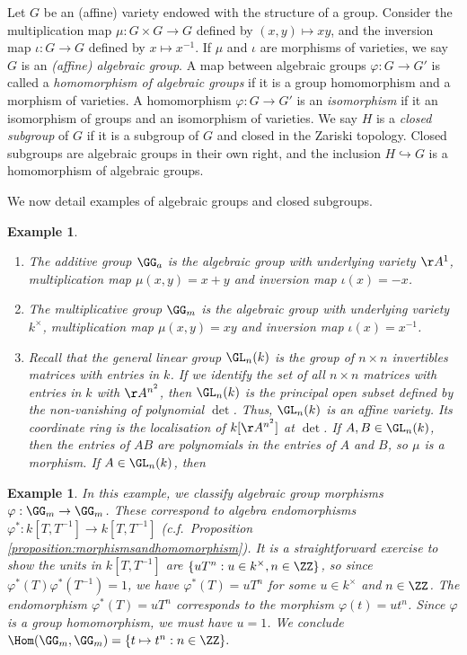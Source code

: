 \documentclass[12pt]{amsart}
\theoremstyle{plain}
\newtheorem{example}[theorem]{Example}
\begin{document}
Let $G$ be an (affine) variety endowed with the structure of a group.
Consider the multiplication map $\mu : G \times G \to G$ defined by $(x, y) \mapsto xy$, and the inversion map $\iota : G \to G$ defined by $x \mapsto x^{-1}$.
If $\mu$ and $\iota$ are morphisms of varieties, we say $G$ is an \emph{(affine) algebraic group}.
A map between algebraic groups $\varphi : G \to G'$ is called a \emph{homomorphism of algebraic groups} if it is a group homomorphism and a morphism of varieties.
A homomorphism $\varphi:G\to G'$ is an \emph{isomorphism} if it an isomorphism of groups and an isomorphism of varieties.
We say $H$ is a \emph{closed subgroup} of $G$ if it is a subgroup of $G$ and closed in the Zariski topology.
Closed subgroups are algebraic groups in their own right, and the inclusion $H \hookrightarrow G$ is a homomorphism of algebraic groups.

We now detail examples of algebraic groups and closed subgroups.

\begin{example}
\begin{enumerate}
\item The additive group $\GG_a$ is the algebraic group with underlying variety $\AA^1$, multiplication map $\mu(x, y) = x + y$ and inversion map $\iota(x) = - x$. 
\item The multiplicative group $\GG_m$ is the algebraic group with underlying variety $k^\times$, multiplication map $\mu(x, y) = xy$ and inversion map $\iota(x) = x^{-1}$.
\item Recall that the general linear group $\GL_n(k)$ is the group of $n \times n$ invertibles matrices with entries in $k$.
If we identify the set of all $n \times n$ matrices with entries in $k$ with $\AA^{n^2}$, then $\GL_n(k)$ is the principal open subset defined by the non-vanishing of polynomial $\det$.
Thus, $\GL_n(k)$ is an affine variety.
Its coordinate ring is the localisation of $k[\AA^{n^2}]$ at $\det$.
If $A, B \in \GL_n(k)$, then the entries of $AB$ are polynomials in the entries of $A$ and $B$, so $\mu$ is a morphism. 
If $A \in \GL_n(k)$, then 
\end{enumerate}
\end{example}

\begin{example}
In this example, we classify algebraic group morphisms $\varphi : \GG_m \to \GG_m$.
These correspond to algebra endomorphisms $\varphi^* : k[T, T^{-1}] \to k[T, T^{-1}]$ (c.f.\ Proposition \ref{proposition:morphismsandhomomorphism}).
It is a straightforward exercise to show the units in $k[T,T^{-1}]$ are $\{u T^n : u \in k^\times, n \in \ZZ\}$, so since $\varphi^*(T)\varphi^*(T^{-1}) = 1$, we have $\varphi^*(T) = u T^n$ for some $u \in k^\times$ and $n \in \ZZ$.
The endomorphism $\varphi^*(T) = u T^n$ corresponds to the morphism $\varphi(t) = u t^n$.
Since $\varphi$ is a group homomorphism, we must have $u =1$.
We conclude $\Hom(\GG_m, \GG_m) = \{t \mapsto t^n : n \in \ZZ\}.$
\end{example}
\end{document}
